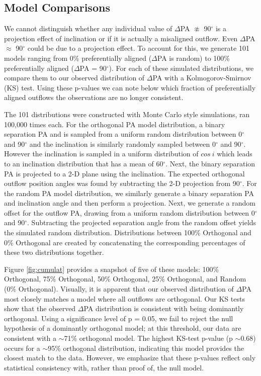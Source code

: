 \documentclass[linenumbers,twocolumn, twocolappendix]{aastex631}
\begin{document}
\subsection{Model Comparisons} \label{sec:results:models}

We cannot distinguish whether any individual value of $\Delta$PA $\not\approx$ 90$^\circ$ is a projection effect of inclination or if it is actually a misaligned outflow. Even $\Delta$PA $\approx$ 90$^\circ$ could be due to a projection effect. To account for this, we generate 101 models ranging from 0\% preferentially aligned ($\Delta$PA is random) to 100\% preferentially aligned ($\Delta$PA = 90$^\circ$). For each of these simulated distributions, we compare them to our observed distribution of $\Delta$PA with a Kolmogorov-Smirnov (KS) test. Using these p-values we can note below which fraction of preferentially aligned outflows the observations are no longer consistent.

The 101 distributions were constructed with Monte Carlo style simulations, ran 100,000 times each. For the orthogonal PA model distribution, a binary separation PA and is sampled from a uniform random distribution between 0$^\circ$ and 90$^\circ$ and the inclination is similarly randomly sampled between 0$^\circ$ and 90$^\circ$. However the inclination is sampled in a uniform distribution of $cos~i$ which leads to an inclination distribution that has a mean of 60$^\circ$. Next, the binary separation PA is projected to a 2-D plane using the inclination. The expected orthogonal outflow position angles was found by subtracting the 2-D projection from 90$^\circ$. For the random PA model distribution, we similarly generate a binary separation PA and inclination angle and then perform a projection. Next, we generate a random offset for the outflow PA, drawing from a uniform random distribution between 0$^\circ$ and 90$^\circ$. Subtracting the projected separation angle from the random offset yields the simulated random distribution. Distributions between 100\% Orthogonal and 0\% Orthogonal are created by concatenating the corresponding percentages of these two distributions together. 

Figure \ref{fig:cumulat} provides a snapshot of five of these models: 100\% Orthogonal, 75\% Orthogonal, 50\% Orthogonal, 25\% Orthogonal, and Random (0\% Orthogonal). Visually, it is apparent that our observed distribution of $\Delta$PA most closely matches a model where all outflows are orthogonal. Our KS tests show that the observed $\Delta$PA distribution is consistent with being dominantly orthogonal. Using a significance level of p = 0.05, we fail to reject the null hypothesis of a dominantly orthogonal model; at this threshold, our data are consistent with a $\sim$71\% orthogonal model. The highest KS-test p-value (p $\sim$0.68) occurs for a $\sim$95\% orthogonal distribution, indicating this model provides the closest match to the data. However, we emphasize that these p-values reflect only statistical consistency with, rather than proof of, the null model.
\end{document}
